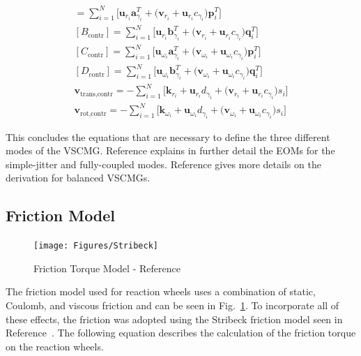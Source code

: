 \begin{gather}
[A_\text{contr}] =  \sum\limits_{i=1}^{N}\Big[\bm{u}_{r_i}\bm{a}_{\gamma_i}^T + \big(\bm{v}_{r_i} + \bm{u}_{r_i}c_{\gamma_i}\big)\bm{p}_i^T\Big]
\\
[B_\text{contr}] =  \sum\limits_{i=1}^{N}\Big[\bm{u}_{r_i}\bm{b}_{\gamma_i}^T + \big(\bm{v}_{r_i} + \bm{u}_{r_i}c_{\gamma_i}\big)\bm{q}_i^T\Big]
\\
[C_\text{contr}] = \sum\limits_{i=1}^{N}\Big[\bm{u}_{\omega_i}\bm{a}_{\gamma_i}^T + \big(\bm{v}_{\omega_i} + \bm{u}_{\omega_i}c_{\gamma_i}\big)\bm{p}_i^T\Big]
\\
[D_\text{contr}] = \sum\limits_{i=1}^{N}\Big[\bm{u}_{\omega_i}\bm{b}_{\gamma_i}^T + \big(\bm{v}_{\omega_i} + \bm{u}_{\omega_i}c_{\gamma_i}\big)\bm{q}_i^T\Big]
\\
\bm{v}_\text{trans,contr} =  -  \sum\limits_{i=1}^{N}\Big[\bm{k}_{r_i}+\bm{u}_{r_i}d_{\gamma_i} + \big(\bm{v}_{r_i} + \bm{u}_{r_i}c_{\gamma_i}\big)s_i\Big]
\\
\bm{v}_\text{rot,contr} = -  \sum\limits_{i=1}^{N}\Big[\bm{k}_{\omega_i} +\bm{u}_{\omega_i}d_{\gamma_i}+ \big(\bm{v}_{\omega_i} + \bm{u}_{\omega_i}c_{\gamma_i}\big)s_i\Big]
\end{gather}

This concludes the equations that are necessary to define the three different modes of the VSCMG. Reference\cite{Alcorn:2016yq} explains in further detail the EOMs for the simple-jitter and fully-coupled modes. Reference\cite{schaub} gives more details on the derivation for balanced VSCMGs.

\subsection{Friction Model}
\label{sec:Friction}

\begin{figure}[htbp]
	\centerline{
		\texttt{[image: Figures/Stribeck]}}
	\caption{Friction Torque Model - Reference~\cite{OLSSON1998176}}
	\label{fig:Stribeck}
\end{figure}

The friction model used for reaction wheels uses a combination of static, Coulomb, and viscous friction and can be seen in Fig.~\ref{fig:Stribeck}. To incorporate all of these effects, the friction was adopted using the Stribeck friction model seen in Reference~\cite{OLSSON1998176}. The following equation describes the calculation of the friction torque on the reaction wheels.

